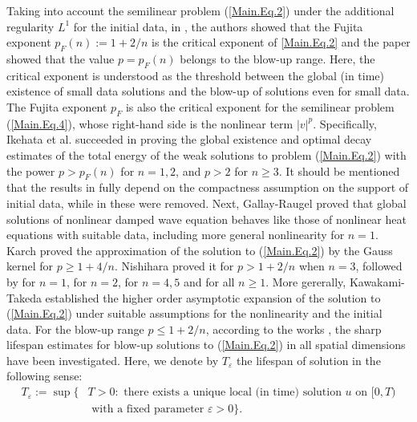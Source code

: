 \documentclass[11pt,reqno]{amsart}
\begin{document}
Taking into account the semilinear problem (\ref{Main.Eq.2})  under the additional regularity $L^1$ for the initial data, in \cite{IkehataMiyaokaNakatake2004, Todorova2001, IkehataOhta2002, IkehataTanizawa2005}, the authors showed that the Fujita exponent $p_F(n):= 1+2/n$ is the critical exponent of \eqref{Main.Eq.2} and the paper \cite{Zhang2001} showed that the value $p= p_F(n)$ belongs to the blow-up range.  Here, the critical exponent is understood as the threshold
between the global (in time) existence of small data solutions and the blow-up of solutions
even for small data. The Fujita exponent $p_F$
 is also the critical exponent for the semilinear problem (\ref{Main.Eq.4}), whose right-hand side is the nonlinear term $|v|^p$. Specifically, Ikehata et al. \cite{IkehataMiyaokaNakatake2004}  succeeded in proving the global existence and optimal decay
estimates of the total energy of the weak solutions to problem (\ref{Main.Eq.2}) with the power $p > p_F(n)$ for $n =1,2$, and $p > 2$ for $n \geq 3$. It should be mentioned that the results in \cite{Todorova2001}  fully depend on
the compactness assumption on the support of initial data, while in \cite{IkehataMiyaokaNakatake2004} these were removed. Next, Gallay-Raugel \cite{GallayRaugel1998} proved that global solutions of nonlinear damped wave equation
behaves like those of nonlinear heat equations with suitable data, including
more general nonlinearity for $n=1$. Karch \cite{Karch2000} proved the approximation
of the solution to (\ref{Main.Eq.2}) by the Gauss kernel for $p \geq 1 +4/n$. Nishihara \cite{Nishihara2003}  proved it for $p > 1+2/n$ when $n=3$, followed by \cite{MarcatiNishihara2003} for $n=1$, \cite{HosonoOgawa2004} for $n=2$, \cite{Narazaki20242} for $n=4, 5$ and \cite{Hayashi2004} for all $n \geq 1$. More gererally, Kawakami-Takeda \cite{KawakamiTakeda2016}  established the higher order asymptotic expansion
of the solution to (\ref{Main.Eq.2}) under suitable assumptions for the nonlinearity and the initial
data. For the blow-up range $p \leq 1 + 2/n$, according to the works \cite{LiZhou1995, Ikeda2016, LaiZhou2019}, the sharp lifespan estimates for blow-up solutions to (\ref{Main.Eq.2}) in all spatial dimensions have been investigated. Here, we denote by $T_{\varepsilon}$ the lifespan of solution in the following sense:
$$
\begin{aligned}
T_{\varepsilon}:=\sup\{& T > 0:\text{ there exists a unique local (in time) solution $u$ on $[0,T)$}\\
&\text{ with a fixed parameter $\varepsilon>0$}\}.
\end{aligned}
$$ 
\end{document}

